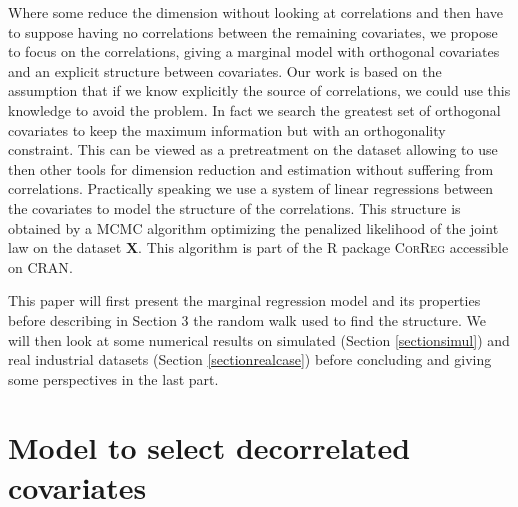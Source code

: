 \documentclass[11pt,a4paper]{article}
\begin{document}
 Where some reduce the dimension without looking at correlations and then have to suppose having no correlations between the remaining covariates,  we propose to focus on the correlations, giving a marginal model with orthogonal covariates and an explicit structure between covariates. Our work is based on the assumption that if we know explicitly the source of correlations, we could use this knowledge to avoid the problem.
 In fact we search the greatest set of orthogonal covariates to keep the maximum information but with an orthogonality constraint. This can be viewed as a pretreatment on the dataset allowing to use then other tools for dimension reduction and estimation without suffering from correlations. Practically speaking we use a system of linear regressions between the covariates to model the structure of the correlations. This structure is obtained by a MCMC algorithm optimizing the penalized likelihood of the joint law on the dataset $\boldsymbol{X}$. This algorithm is part of the R package \textsc{CorReg} accessible on \textsc{CRAN}. %
 
	
 	
 	This paper will first present the marginal regression model and its properties before describing in Section 3 the random walk used to find the structure.
 	We will then look at some numerical results on simulated (Section \ref{sectionsimul}) and real industrial datasets (Section \ref{sectionrealcase}) before concluding and giving some perspectives in the last part.
	
\section{Model to select decorrelated covariates}
\end{document}
